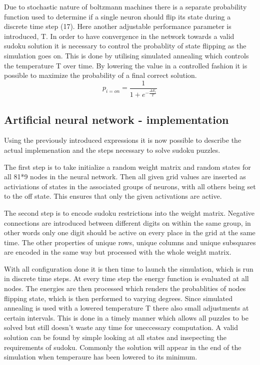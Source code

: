 \documentclass[a4paper,11pt]{kth-mag}
\begin{document}
Due to stochastic nature of boltzmann machines there is a separate probability function used to determine if a single neuron should flip its state during a discrete time step (17).
Here another adjustable performance parameter is introduced, T.
In order to have convergence in the network towards a valid sudoku solution it is necessary to control the probablity of state flipping as the simulation goes on.
This is done by utilising simulated annealing which controls the temperature T over time.
By lowering the value in a controlled fashion it is possible to maximize the probability of a final correct solution.
\[
p_{i=on} = \frac{1}{1+e^{-\frac{\Delta E_{i}}{T}}}
\]

\subsection{Artificial neural network - implementation}

Using the previously introduced expressions it is now possible to describe the actual implemenation and the steps necessary to solve sudoku puzzles.
\newline

The first step is to take initialize a random weight matrix and random states for all 81*9 nodes in the neural network.
Then all given grid values are inserted as activiations of states in the associated groups of neurons, with all others being set to the off state.
This ensures that only the given activations are active.
\newline

The second step is to encode sudoku restrictions into the weight matrix.
Negative connections are introduced between different digits on within the same group, in other words only one digit should be active on every place in the grid at the same time.
The other properties of unique rows, unique columns and unique subsquares are encoded in the same way but processed with the whole weight matrix.
\newline

With all configuration done it is then time to launch the simulation, which is run in discrete time steps.
At every time step the energy function is evaluated at all nodes.
The energies are then processed which renders the probablities of nodes flipping state, which is then performed to varying degrees.
Since simulated annealing is used with a lowered temperature T there also small adjustments at certain intervals.
This is done in a timely manner which allows all puzzles to be solved but still doesn't waste any time for uneccessary computation.
\newline
A valid solution can be found by simple looking at all states and insepecting the requirements of sudoku.
Commonly the solution will appear in the end of the simulation when temperaure has been lowered to its minimum.
\end{document}
